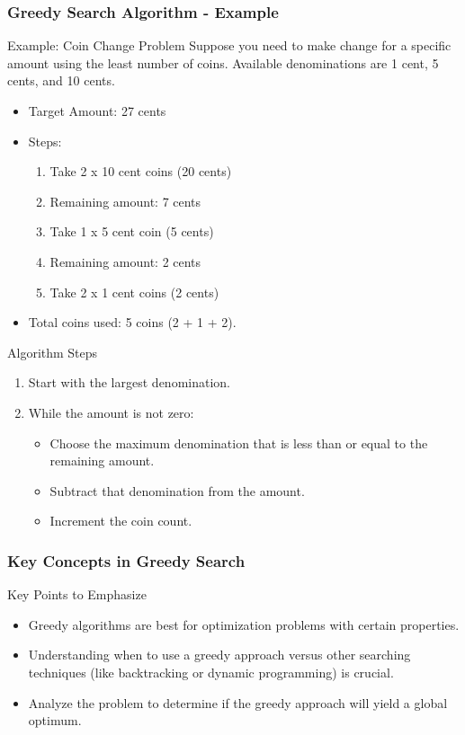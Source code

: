 \documentclass[aspectratio=169]{beamer}
\begin{document}
\begin{frame}[fragile]
    \frametitle{Greedy Search Algorithm - Example}
    \begin{block}{Example: Coin Change Problem}
        Suppose you need to make change for a specific amount using the least number of coins. Available denominations are 1 cent, 5 cents, and 10 cents.
        \begin{itemize}
            \item Target Amount: 27 cents
            \item Steps:
            \begin{enumerate}
                \item Take 2 x 10 cent coins (20 cents)
                \item Remaining amount: 7 cents
                \item Take 1 x 5 cent coin (5 cents)
                \item Remaining amount: 2 cents
                \item Take 2 x 1 cent coins (2 cents)
            \end{enumerate}
            \item Total coins used: 5 coins (2 + 1 + 2).
        \end{itemize}
    \end{block}

    \begin{block}{Algorithm Steps}
        \begin{enumerate}
            \item Start with the largest denomination.
            \item While the amount is not zero:
            \begin{itemize}
                \item Choose the maximum denomination that is less than or equal to the remaining amount.
                \item Subtract that denomination from the amount.
                \item Increment the coin count.
            \end{itemize}
        \end{enumerate}
    \end{block}
\end{frame}

\begin{frame}[fragile]
    \frametitle{Key Concepts in Greedy Search}
    \begin{block}{Key Points to Emphasize}
        \begin{itemize}
            \item Greedy algorithms are best for optimization problems with certain properties.
            \item Understanding when to use a greedy approach versus other searching techniques (like backtracking or dynamic programming) is crucial.
            \item Analyze the problem to determine if the greedy approach will yield a global optimum.
        \end{itemize}
    \end{block}
\end{frame}
\end{document}
